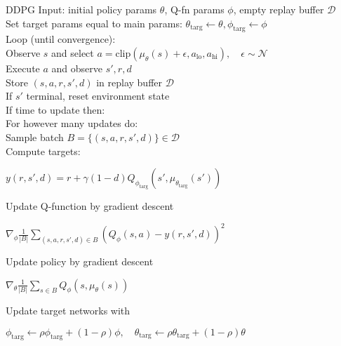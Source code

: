 \documentclass[twocolumn]{article}
\begin{document}
\begin{mydef}{DDPG}{}
    Input: initial policy params $\theta$, Q-fn params $\phi$, empty replay buffer $\mathcal D$ \\
    Set target params equal to main params: $\theta_{\text{targ}} \leftarrow \theta, \phi_{\text{targ}} \leftarrow \phi$ \\
    Loop (until convergence): \\
        \hspace*{2em}Observe $s$ and select $a = \text{clip}(\mu_\theta(s) + \epsilon, a_{\text{lo}}, a_{\text{hi}}), \quad \epsilon \sim \mathcal N$ \\
        \hspace*{2em}Execute $a$ and observe $s', r, d$ \\
        \hspace*{2em}Store $(s, a, r, s', d)$ in replay buffer $\mathcal D$ \\
        \hspace*{2em}If $s'$ terminal, reset environment state \\
        \hspace*{2em}If time to update then: \\
            \hspace*{4em}For however many updates do: \\
                \hspace*{6em}Sample batch $B = \{(s, a, r, s', d)\} \in \mathcal D$ \\
                \hspace*{6em}Compute targets:
                
                \centering $y(r, s', d) = r + \gamma(1-d) Q_{\phi_{\text{targ}}}(s', \mu_{\theta_{\text{targ}}}(s'))$ \flushleft

                \hspace*{6em}Update Q-function by gradient descent

                \centering $\nabla_\phi \frac{1}{|B|} \sum_{(s,a,r,s',d) \in B} (Q_\phi(s,a) - y(r,s',d))^2$ \flushleft

                \hspace*{6em}Update policy by gradient descent

                \centering $\nabla_\theta \frac{1}{|B|} \sum_{s \in B} Q_\phi(s, \mu_\theta(s))$ \flushleft

                \hspace*{6em}Update target networks with

                \centering $\phi_{\text{targ}} \leftarrow \rho \phi_{\text{targ}} + (1-\rho) \phi, \quad \theta_{\text{targ}} \leftarrow \rho \theta_{\text{targ}} + (1-\rho) \theta$
\end{mydef}
\end{document}
